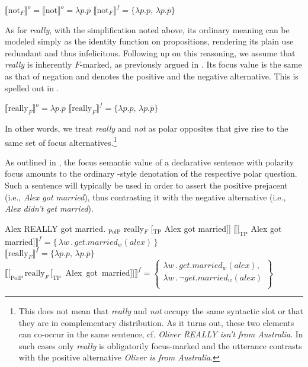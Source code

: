 \documentclass[output=paper,colorlinks,citecolor=brown]{langscibook}
\begin{document}
\is{}
\ea\label{Neg.Sem} 
    \ea $ \llbracket \text{not}_{F} \rrbracket ^o = \llbracket \text{not} \rrbracket ^o =   \lambda p. \overline p $ 
    \ex $ \llbracket \text{not} _{F} \rrbracket ^f = \{ \lambda p.p, \, \lambda p. \overline p \}$
    \z
\z
\il{}

As for \textit{really}, with the simplification noted above, its ordinary meaning can be modeled simply as the identity function on propositions, rendering its plain use redundant and thus infelicitous. Following up on this reasoning, we assume that \textit{really} is inherently $F$-marked, as previously argued in \citet{romero2004}. Its focus value is the same as that of negation and denotes the positive and the negative alternative. This is spelled out in . 

\is{}
\ea\label{Rly.Sem}
    \ea $  \llbracket \text{really} _{F} \rrbracket ^o = \lambda p.p$
    \ex  $ \llbracket \text{really} _{F} \rrbracket ^f = \{ \lambda p.p, \, \lambda p. \overline p \}$
    \z
\z
\il{}

\noindent
In other words, we treat \textit{really} and \textit{not} as polar opposites that give rise to the same set of focus alternatives.\footnote{This does not mean that \textit{really} and \textit{not} occupy the same syntactic slot or that they are in complementary distribution. As it turns out, these two elements can co-occur in the same sentence, cf. \textit{Oliver REALLY isn't from Australia}. In such cases only \textit{really} is obligatorily focus-marked and the utterance contrasts with the positive alternative \textit{Oliver is from Australia}.}

As outlined in , the focus semantic value of a declarative sentence with polarity focus amounts to the ordinary \citet{Hamblin1973}-style denotation of the respective polar question. Such a sentence will typically be used in order to assert the positive prejacent (i.e., \textit{Alex got married}), thus contrasting it with the negative alternative (i.e., \textit{Alex didn't get married}). 

\is{}
\ea Alex REALLY got married.\label{Rly.FocV}  
    \ea  {[}$_{\text{PolP}}$ really$_{F}$ [$_{\text{TP}}$ Alex got married]] 
    \ex $\llbracket [_{\text{TP}}$ Alex got married]$\rrbracket ^ f = \{\, \lambda w \, . \, get.married_w(alex) \, \}$ \\
        $ \llbracket \text{really} _{F} \rrbracket ^f = \{ \lambda p.p, \, \lambda p. \overline p \}$ \\
        \mbox{$\llbracket [_{\text{PolP}} \, \text{really}_{F} \, [_{\text{TP}}$ Alex got married]]$\rrbracket^{f} = \left\{ \begin{array}{l}
            \lambda w \, . \, get.married_w(alex), \\ 
            \lambda w \, . \, \neg get.married_w(alex) \\ 
            \end{array} \right\}  $}
    \z
\z
\il{}
\end{document}
